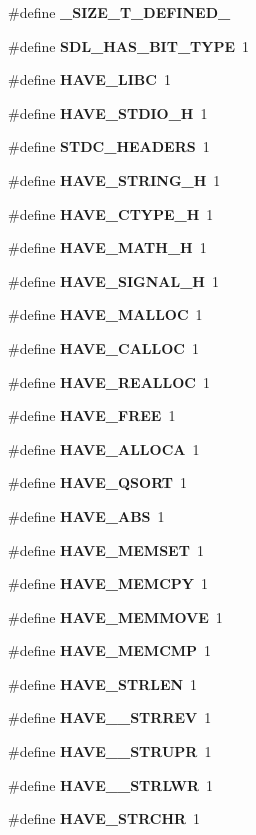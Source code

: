 \begin{DoxyCompactItemize}
\item 
\#define {\bf \+\_\+\+S\+I\+Z\+E\+\_\+\+T\+\_\+\+D\+E\+F\+I\+N\+E\+D\+\_\+}
\item 
\#define {\bf S\+D\+L\+\_\+\+H\+A\+S\+\_\+B\+I\+T\+\_\+\+T\+Y\+P\+E}~1
\item 
\#define {\bf H\+A\+V\+E\+\_\+\+L\+I\+B\+C}~1
\item 
\#define {\bf H\+A\+V\+E\+\_\+\+S\+T\+D\+I\+O\+\_\+\+H}~1
\item 
\#define {\bf S\+T\+D\+C\+\_\+\+H\+E\+A\+D\+E\+R\+S}~1
\item 
\#define {\bf H\+A\+V\+E\+\_\+\+S\+T\+R\+I\+N\+G\+\_\+\+H}~1
\item 
\#define {\bf H\+A\+V\+E\+\_\+\+C\+T\+Y\+P\+E\+\_\+\+H}~1
\item 
\#define {\bf H\+A\+V\+E\+\_\+\+M\+A\+T\+H\+\_\+\+H}~1
\item 
\#define {\bf H\+A\+V\+E\+\_\+\+S\+I\+G\+N\+A\+L\+\_\+\+H}~1
\item 
\#define {\bf H\+A\+V\+E\+\_\+\+M\+A\+L\+L\+O\+C}~1
\item 
\#define {\bf H\+A\+V\+E\+\_\+\+C\+A\+L\+L\+O\+C}~1
\item 
\#define {\bf H\+A\+V\+E\+\_\+\+R\+E\+A\+L\+L\+O\+C}~1
\item 
\#define {\bf H\+A\+V\+E\+\_\+\+F\+R\+E\+E}~1
\item 
\#define {\bf H\+A\+V\+E\+\_\+\+A\+L\+L\+O\+C\+A}~1
\item 
\#define {\bf H\+A\+V\+E\+\_\+\+Q\+S\+O\+R\+T}~1
\item 
\#define {\bf H\+A\+V\+E\+\_\+\+A\+B\+S}~1
\item 
\#define {\bf H\+A\+V\+E\+\_\+\+M\+E\+M\+S\+E\+T}~1
\item 
\#define {\bf H\+A\+V\+E\+\_\+\+M\+E\+M\+C\+P\+Y}~1
\item 
\#define {\bf H\+A\+V\+E\+\_\+\+M\+E\+M\+M\+O\+V\+E}~1
\item 
\#define {\bf H\+A\+V\+E\+\_\+\+M\+E\+M\+C\+M\+P}~1
\item 
\#define {\bf H\+A\+V\+E\+\_\+\+S\+T\+R\+L\+E\+N}~1
\item 
\#define {\bf H\+A\+V\+E\+\_\+\+\_\+\+S\+T\+R\+R\+E\+V}~1
\item 
\#define {\bf H\+A\+V\+E\+\_\+\+\_\+\+S\+T\+R\+U\+P\+R}~1
\item 
\#define {\bf H\+A\+V\+E\+\_\+\+\_\+\+S\+T\+R\+L\+W\+R}~1
\item 
\#define {\bf H\+A\+V\+E\+\_\+\+S\+T\+R\+C\+H\+R}~1

\end{DoxyCompactItemize}

